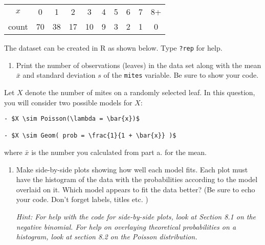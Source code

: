 \documentclass[
]{article}
\providecommand{\tightlist}{%
  \setlength{\itemsep}{0pt}\setlength{\parskip}{0pt}}
\begin{document}
\begin{table}[h]
\centering
\begin{tabular}{c|ccccccccc} \hline
$x$ & 0 & 1 & 2 & 3 & 4 & 5 & 6 & 7 & 8+ \\
count & 70 & 38 & 17 & 10 & 9 & 3 & 2 & 1 & 0 \\ \hline
\end{tabular}
\end{table}

The dataset can be created in R as shown below. Type \texttt{?rep} for
help.

\begin{enumerate}
\def\labelenumi{\alph{enumi}.}
\tightlist
\item
  Print the number of observations (leaves) in the data set along with
  the mean \(\bar{x}\) and standard deviation \(s\) of the
  \texttt{mites} variable. Be sure to show your code.
\end{enumerate}

Let \(X\) denote the number of mites on a randomly selected leaf. In
this question, you will consider two possible models for \(X\):

\begin{verbatim}
- $X \sim Poisson(\lambda = \bar{x})$ 

- $X \sim Geom( prob = \frac{1}{1 + \bar{x}} )$
\end{verbatim}

where \(\bar{x}\) is the number you calculated from part a. for the
mean.

\begin{enumerate}
\def\labelenumi{\alph{enumi}.}
\setcounter{enumi}{1}
\item
  Make side-by-side plots showing how well each model fits. Each plot
  must have the histogram of the data with the probabilities according
  to the model overlaid on it. Which model appears to fit the data
  better? (Be sure to echo your code. Don't forget labels, titles etc. )

  \emph{Hint: For help with the code for side-by-side plots, look at Section 8.1 on the negative binomial. For help on overlaying theoretical probabilities on a histogram, look at  section 8.2 on the Poisson distribution.}
\end{enumerate}
\end{document}

